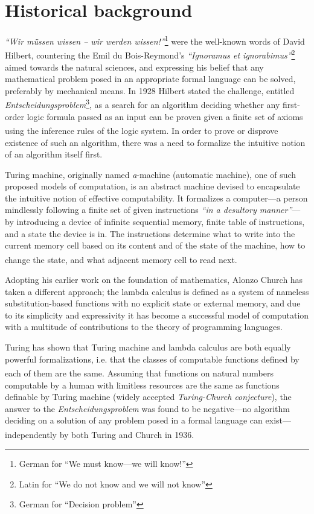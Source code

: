 \documentclass[table, a4paper, 10pt]{book}
\newcommand{\cit}[1]{\textsuperscript{\cite{#1}}}
\newcommand{\footnoteafterquote}[1]{\hspace{0.05cm}\footnote{#1}}
\begin{document}
\section{Historical background}
\textit{``Wir müssen wissen -- wir werden wissen!''}\footnoteafterquote{German for ``We must know---we will know!''}
were the well-known words of David Hilbert,
countering the Emil du Bois-Reymond's
\textit{``Ignoramus et ignorabimus''}\footnoteafterquote{Latin for ``We do not know and we will not know''}
aimed towards the natural sciences, and expressing his belief that any mathematical
problem posed in an appropriate formal language
can be solved, preferably by mechanical means. 
In 1928 Hilbert stated the challenge,
entitled \textit{Entscheidungsproblem}\footnote{German for ``Decision problem''},
as a search for an algorithm deciding whether any
first-order logic formula passed as an input
can be proven given a finite set of axioms using the inference rules of the logic system.\cit{hilbert}
In order to prove or disprove existence of
such an algorithm, there was a need to
formalize the intuitive notion of an algorithm itself first.

Turing machine, originally named \textit{a}-machine (automatic machine), one of such proposed
models of computation, is an abstract machine devised
to encapsulate the intuitive notion of effective computability. It formalizes
a computer---a person mindlessly following a finite set of given
instructions \textit{``in a desultory manner''}---by introducing
a device of infinite sequential memory, finite table of instructions, and
a state the device is in. The instructions determine what to write into the
current memory cell based on its content and of the state of the machine,
how to change the state, and what adjacent memory cell to read next.\cit{turingPaper}

Adopting his earlier work on the foundation of mathematics, Alonzo Church
has taken a different approach; the lambda calculus is defined
as a system of nameless substitution-based functions with no explicit state or external memory,
and due to its simplicity and expressivity it has become a successful model of computation
with a multitude of contributions to the theory of programming languages.
 
Turing has shown that Turing machine and lambda calculus are both equally powerful formalizations, i.e. that
the classes of computable functions defined by each of them are the same.\cit{turingDefin}
Assuming that functions on natural numbers computable by a human
with limitless resources are the same as functions definable by Turing machine (widely accepted \textit{Turing-Church conjecture}),
the answer to the \textit{Entscheidungsproblem} was found to be negative---no algorithm deciding on a
solution of any problem posed in a formal language can exist---independently by both Turing and Church
in 1936.\cit{turingPaper, churchPaper}
\end{document}
